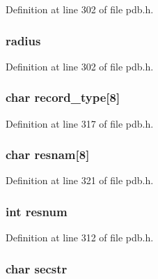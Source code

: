 Definition at line 302 of file pdb.\-h.

\hypertarget{structpdb__entry_adbb0a693780e69d9de0f58378fc1eb23}{
\subsubsection[{radius}]{ radius}}\label{structpdb__entry_adbb0a693780e69d9de0f58378fc1eb23}


Definition at line 302 of file pdb.\-h.

\hypertarget{structpdb__entry_ac3b9b5be75a753a35e50eaf08be8e77e}{
\subsubsection[{record\-\_\-type}]{\setlength{\rightskip}{0pt plus 5cm}char record\-\_\-type\mbox{[}8\mbox{]}}}\label{structpdb__entry_ac3b9b5be75a753a35e50eaf08be8e77e}


Definition at line 317 of file pdb.\-h.

\hypertarget{structpdb__entry_a6f47476bfe0dd0abc0ade4a21127dfc2}{
\subsubsection[{resnam}]{\setlength{\rightskip}{0pt plus 5cm}char resnam\mbox{[}8\mbox{]}}}\label{structpdb__entry_a6f47476bfe0dd0abc0ade4a21127dfc2}


Definition at line 321 of file pdb.\-h.

\hypertarget{structpdb__entry_a7503a437042b8ae030eefb90decd7ceb}{
\subsubsection[{resnum}]{\setlength{\rightskip}{0pt plus 5cm}int resnum}}\label{structpdb__entry_a7503a437042b8ae030eefb90decd7ceb}


Definition at line 312 of file pdb.\-h.

\hypertarget{structpdb__entry_ab7cdf860f05e4d3fc40b6f1f7a651eef}{
\subsubsection[{secstr}]{\setlength{\rightskip}{0pt plus 5cm}char secstr}}\label{structpdb__entry_ab7cdf860f05e4d3fc40b6f1f7a651eef}


